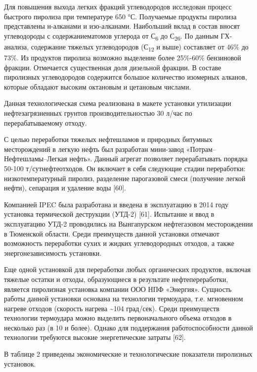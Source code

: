 \begin{multicols}{2}
Для повышения выхода легких фракций углеводородов исследован процесс
быстрого пиролиза при температуре 650 °С. Получаемые продукты пиролиза
представлены н-алканами и изо-алканами. Наибольший вклад в состав вносят
углеводороды с содержаниематомов углерода от С\textsubscript{6} до
С\textsubscript{26}. По данным ГХ-анализа, содержание тяжелых
углеводородов (С\textsubscript{12} и выше) составляет от 46\% до 73\%.
Из продуктов пиролиза возможно выделение более 25\%-60\% бензиновой
фракции. Отмечается существенная доля дизельной фракции. В составе
пиролизных углеводородов содержится большое количество изомерных
алканов, которые обладают высоким октановым и цетановым числами.

Данная технологическая схема реализована в макете установки утилизации
нефтезагрязненных грунтов производительностью 30 л/час по
перерабатываемому отходу.

С целью переработки тяжелых нефтешламов и при­родных битумных
месторождений в легкую нефть был разработан мини-завод
«Потрам--Нефтешламы--Легкая нефть». Данный агрегат позволяет
перерабатывать поряд­ка 50-100 т/сутнефтеотходов. Он включает в себя
следую­щие стадии переработки: низкотемпературный пиролиз, разделение
парогазовой смеси (получение легкой нефти), сепарация и удаление воды
{[}60{]}.

Компанией IPEC была разработана и введена в экс­плуатацию в 2014 году
установка термической деструк­ции (УТД-2) {[}61{]}. Испытание и ввод в
эксплуатацию УТД-2 проводились на Вынгапурском нефтегазовом
месторож­дении в Тюменской области. Среди преимуществ данной установки
отмечают возможность переработки сухих и жидких углеводородных отходов,
а также энергонезави­симость установки.

Еще одной установкой для переработки любых орга­нических продуктов,
включая тяжелые остатки и отходы, образующиеся в результате
нефтепереработки, является пиролизная установка компании ООО НПФ
«Энергия». Сущность работы данной установки основана на тех­нологии
термоудара, т.е. мгновенном нагреве отходов (скорость нагрева
\textasciitilde104 град/сек). Среди преимуществ технологии термоудара
можно выделить первоначально­го объема отходов в несколько раз (в 10 и
более). Однако для поддержания работоспособности данной технологии
требуются высокие энергетические затраты {[}62{]}.

В таблице 2 приведены экономические и технологические показатели
пиролизных установок.
\end{multicols}


